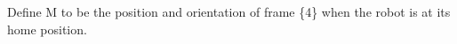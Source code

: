 \documentclass[preview]{standalone}
\begin{document}
\begin{center}
Define M to be the position and orientation of frame \{4\} when the robot is at its home position.
\end{center}
\end{document}
